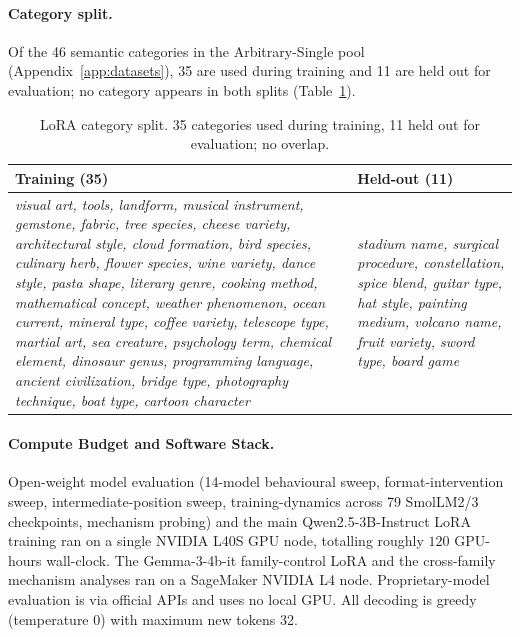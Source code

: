 \documentclass[letterpaper]{article} %
\begin{document}
\paragraph{Category split.}
Of the 46 semantic categories in the Arbitrary-Single pool
(Appendix~\ref{app:datasets}), 35 are used during training and 11
are held out for evaluation; no category appears in both splits
(Table~\ref{tab:lora_categories}).

\begin{table}[!htbp]
\centering
\footnotesize
\begin{tabular}{p{} p{}}
\toprule
\textbf{Training (35)} & \textbf{Held-out (11)} \\
\midrule
\emph{visual art, tools, landform, musical instrument, gemstone,
fabric, tree species, cheese variety, architectural style, cloud
formation, bird species, culinary herb, flower species, wine
variety, dance style, pasta shape, literary genre, cooking method,
mathematical concept, weather phenomenon, ocean current, mineral
type, coffee variety, telescope type, martial art, sea creature,
psychology term, chemical element, dinosaur genus, programming
language, ancient civilization, bridge type, photography technique,
boat type, cartoon character} &
\emph{stadium name, surgical procedure, constellation, spice blend,
guitar type, hat style, painting medium, volcano name, fruit variety,
sword type, board game} \\
\bottomrule
\end{tabular}
\caption{LoRA category split. 35 categories used during training, 11
held out for evaluation; no overlap.}
\label{tab:lora_categories}
\end{table}

\paragraph{Compute Budget and Software Stack.}
Open-weight model evaluation (14-model behavioural sweep,
format-intervention sweep, intermediate-position sweep,
training-dynamics across 79 SmolLM2/3 checkpoints, mechanism
probing) and the main Qwen2.5-3B-Instruct LoRA training ran on a
single NVIDIA L40S GPU node, totalling roughly $120$ GPU-hours
wall-clock. The Gemma-3-4b-it family-control LoRA and the
cross-family mechanism analyses ran on a SageMaker NVIDIA L4 node.
Proprietary-model evaluation is via official APIs and uses no local
GPU. All decoding is greedy (temperature 0) with maximum new
tokens 32.
\end{document}
